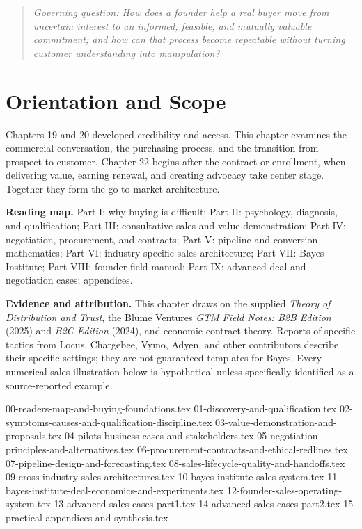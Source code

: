 
\begin{quote}
\textit{Governing question: How does a founder help a real buyer move from uncertain interest to an informed, feasible, and mutually valuable commitment; and how can that process become repeatable without turning customer understanding into manipulation?}
\end{quote}

\vspace{1.5pt}

\section*{Orientation and Scope}

Chapters 19 and 20 developed credibility and access. This chapter examines the commercial conversation, the purchasing process, and the transition from prospect to customer. Chapter 22 begins after the contract or enrollment, when delivering value, earning renewal, and creating advocacy take center stage. Together they form the go-to-market architecture.

\textbf{Reading map.} Part I: why buying is difficult; Part II: psychology, diagnosis, and qualification; Part III: consultative sales and value demonstration; Part IV: negotiation, procurement, and contracts; Part V: pipeline and conversion mathematics; Part VI: industry-specific sales architecture; Part VII: Bayes Institute; Part VIII: founder field manual; Part IX: advanced deal and negotiation cases; appendices.

\textbf{Evidence and attribution.} This chapter draws on the supplied \textit{Theory of Distribution and Trust}, the Blume Ventures \textit{GTM Field Notes: B2B Edition} (2025) and \textit{B2C Edition} (2024), and economic contract theory. Reports of specific tactics from Locus, Chargebee, Vymo, Adyen, and other contributors describe their specific settings; they are not guaranteed templates for Bayes. Every numerical sales illustration below is hypothetical unless specifically identified as a source-reported example.

{00-readers-map-and-buying-foundations.tex}
{01-discovery-and-qualification.tex}
{02-symptoms-causes-and-qualification-discipline.tex}
{03-value-demonstration-and-proposals.tex}
{04-pilots-business-cases-and-stakeholders.tex}
{05-negotiation-principles-and-alternatives.tex}
{06-procurement-contracts-and-ethical-redlines.tex}
{07-pipeline-design-and-forecasting.tex}
{08-sales-lifecycle-quality-and-handoffs.tex}
{09-cross-industry-sales-architectures.tex}
{10-bayes-institute-sales-system.tex}
{11-bayes-institute-deal-economics-and-experiments.tex}
{12-founder-sales-operating-system.tex}
{13-advanced-sales-cases-part1.tex}
{14-advanced-sales-cases-part2.tex}
{15-practical-appendices-and-synthesis.tex}
